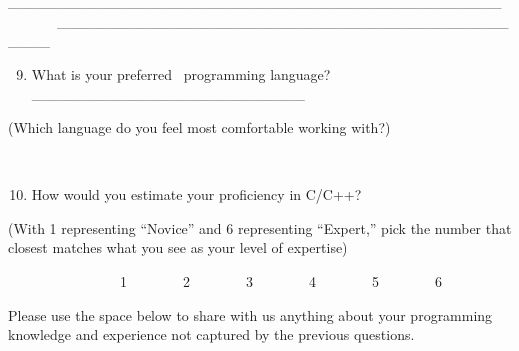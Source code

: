 \documentclass[12pt, a4paper, oneside]{article}
\providecommand{\tightlist}{%
  \setlength{\itemsep}{0pt}\setlength{\parskip}{0pt}}
\begin{document}
{\_\_\_\_\_\_\_\_\_\_\_\_\_\_\_\_\_\_\_\_\_\_\_\_\_\_\_\_\_\_\_\_\_\_\_\_\_\_\_\_\_\_\_\_\_\_\_~~~~~~~~\_\_\_\_\_\_\_\_\_\_\_\_\_\_\_\_\_\_\_\_\_\_\_\_\_\_\_\_\_\_\_\_\_\_\_\_\_\_\_\_\_\_\_\_\_\_\_~~~~~~~~
}

\begin{enumerate}
\setcounter{enumi}{8}
\tightlist
\item
  {What is your preferred ~programming language?
  \_\_\_\_\_\_\_\_\_\_\_\_\_\_\_\_\_\_\_\_\_\_\_\_\_\_}
\end{enumerate}

{(Which language do you feel most comfortable working with?)}

{~~~~~~~~}

\begin{enumerate}
\setcounter{enumi}{9}
\tightlist
\item
  {How would you estimate your proficiency in C/C++?}
\end{enumerate}

{(With 1 representing ``Novice'' and 6 representing ``Expert,'' pick the
number that closest matches what you see as your level of expertise)}

{~~~~~~~~~~~~~~~~1~~~~~~~~2~~~~~~~~3~~~~~~~~4~~~~~~~~5~~~~~~~~6~~~~~~~~}

{Please use the space below to share with us anything about your
programming knowledge and experience not captured by the previous
questions.}
\end{document}
